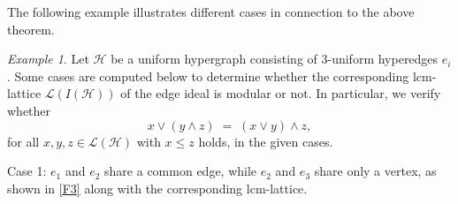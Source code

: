 \documentclass[11pt]{amsart}
\newcommand{\lcm}{\mathrm{lcm}}
\theoremstyle{plain}
\numberwithin{lemma}{\DefaultNumberTheoremWithin}
\numberwithin{claim}{\DefaultNumberTheoremWithin}
\numberwithin{theorem}{\DefaultNumberTheoremWithin}
\numberwithin{corollary}{\DefaultNumberTheoremWithin}
\numberwithin{proposition}{\DefaultNumberTheoremWithin}
\numberwithin{conjecture}{\DefaultNumberTheoremWithin}
\theoremstyle{definition}
\numberwithin{definition}{\DefaultNumberTheoremWithin}
\theoremstyle{definition}
\numberwithin{question}{\DefaultNumberTheoremWithin}
\theoremstyle{definition}
\numberwithin{problem}{\DefaultNumberTheoremWithin}
\theoremstyle{remark}
\numberwithin{remark}
     {\DefaultNumberTheoremWithin}
\theoremstyle{remark}
\newtheorem{example}{Example}
\numberwithin{example}{\DefaultNumberTheoremWithin}
\begin{document}
The following example illustrates different cases in connection to the above theorem.
\begin{example}\label{exampmodulr}
     Let $\mathcal{H}$ be a uniform hypergraph consisting of 3-uniform hyperedges $e_i$. Some cases are computed below to determine whether the corresponding $\lcm$-lattice $\mathcal{L}(I(\mathcal{H}))$ of the edge ideal is modular or not. In particular, we verify whether 
\[
x \vee (y \wedge z) \;=\; (x \vee y) \wedge z,
\]
for all $x, y, z \in \mathcal{L}(\mathcal{H})$ with $x \leq z$ holds, in the given cases.

Case 1: $e_1$ and $e_2$ share a common edge, while $e_2$ and $e_3$ share only a vertex, as shown in \ref{F3} along with the corresponding $\lcm$-lattice.


\end{example}
\end{document}
